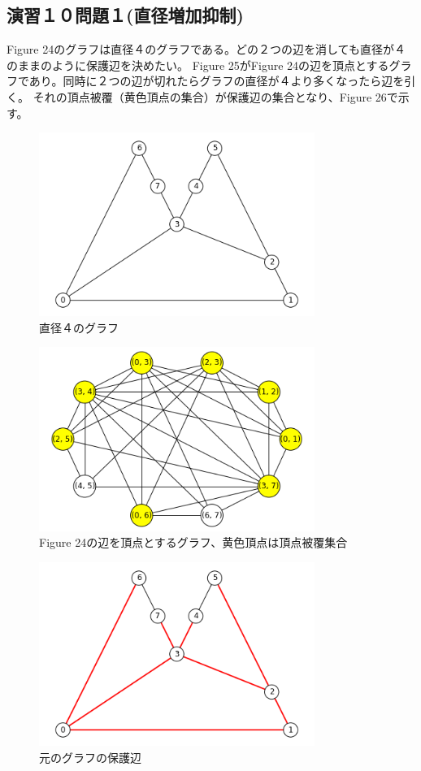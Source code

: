 \documentclass{report}
\begin{document}
\begin{CJK}{UTF8}{min}
    \section*{演習１０問題１(直径増加抑制)}
    Figure 24のグラフは直径４のグラフである。どの２つの辺を消しても直径が４のままのように保護辺を決めたい。
    Figure 25がFigure 24の辺を頂点とするグラフであり。同時に２つの辺が切れたらグラフの直径が４より多くなったら辺を引く。
    それの頂点被覆（黄色頂点の集合）が保護辺の集合となり、Figure 26で示す。
    \begin{figure}[!h]
        \centerline{\includegraphics[width=0.8\textwidth]{data/ex10-1.png}}
        \caption{直径４のグラフ}
    \end{figure}
    \begin{figure}[!h]
        \centerline{\includegraphics[width=0.8\textwidth]{data/ex10-2.png}}
        \caption{Figure 24の辺を頂点とするグラフ、黄色頂点は頂点被覆集合}
    \end{figure}
    \begin{figure}[!h]
        \centerline{\includegraphics[width=0.8\textwidth]{data/ex10-3.png}}
        \caption{元のグラフの保護辺}
    \end{figure}


\end{CJK}
\end{document}
